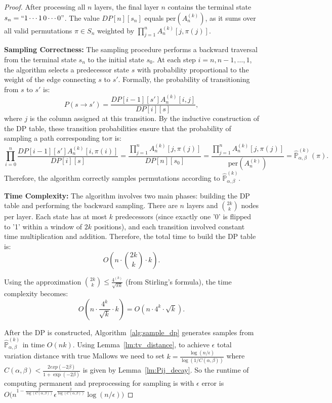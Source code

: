 \documentclass{article}
\renewcommand{\P}{\mathbb{P}}
\begin{document}
\begin{proof}
After processing all \(n\) layers, the final layer \(n\) contains the terminal state \(s_n = ``1\cdots1\,0\cdots0"\). The value \(DP[n][s_n]\) equals \(\text{per}(A_n^{(k)})\), as it sums over all valid permutations \(\pi \in S_n\) weighted by \(\prod_{j=1}^n A_n^{(k)}[j, \pi(j)]\).

\textbf{Sampling Correctness:}
The sampling procedure performs a backward traversal from the terminal state \(s_n\) to the initial state \(s_0\). At each step \(i = n, n-1, \dots, 1\), the algorithm selects a predecessor state \(s\) with probability proportional to the weight of the edge connecting \(s\) to \(s'\). Formally, the probability of transitioning from \(s\) to \(s'\) is:
\[
P(s \rightarrow s') = \frac{ DP[i-1][s'] A_n^{(k)}[i, j]}{DP[i][s]},
\]
where \(j\) is the column assigned at this transition.
By the inductive construction of the DP table, these transition probabilities ensure that the probability of sampling a path
corresponding to\(\pi\) is:
\[\prod_{i=0}^n\frac{ DP[i-1][s'] A_n^{(k)}[i, \pi(i)]}{DP[i][s]}=\frac{\prod_{j=1}^n A_n^{(k)}[j, \pi(j)]}{DP[n][s_0]}=\frac{\prod_{j=1}^n A_n^{(k)}[j, \pi(j)]}{\text{per}(A_n^{(k)})} = \hat{\P}_{\alpha,\beta}^{(k)}(\pi).
\]
Therefore, the algorithm correctly samples permutations according to \(\hat{\P}_{\alpha,\beta}^{(k)}\).

\textbf{Time Complexity:}
The algorithm involves two main phases: building the DP table and performing the backward sampling. There are $n$ layers and  \(\binom{2k}{k}\) nodes per layer. Each state has at most \(k\) predecessors (since exactly one '0' is flipped to '1' within a window of \(2k\) positions), and each transition involved constant time multiplication and addition.     
    Therefore, the total time to build the DP table is:
    \[
    O\left(n \cdot \binom{2k}{k} \cdot k\right).
    \]
    
    Using the approximation \(\binom{2k}{k} \leq \frac{4^{(k)}}{\sqrt{\pi k}}\) (from Stirling's formula), the time complexity becomes:
    \[
    O\left(n \cdot \frac{4^k}{\sqrt{k}} \cdot k\right) = O\left(n \cdot 4^k \cdot \sqrt{k}\right).
    \]
    
After the DP is constructed, Algorithm~\ref{alg:sample_dp} generates samples from \(\hat{\P}_{\alpha,\beta}^{(k)}\) in time \(O(nk)\).
Using Lemma~\ref{lm:tv_distance}, to achieve $\epsilon$ total variation distance with true Mallows we need to set $k=\frac{\log(n/\epsilon)}{\log(1/C(\alpha,\beta))}$ where $C(\alpha,\beta)<\frac{2exp(-2\beta)}{1+\exp(-2\beta)}$ is given by Lemma~\ref{lm:Pij_decay}. So the runtime of computing permanent and preprocessing for sampling is  with $\epsilon$ error is $O\Big(n^{1-\frac{2}{\log(C(\alpha,\beta))}}\epsilon^{\frac{2}{\log(C(\alpha,\beta))}}\log(n/\epsilon)\Big)$
\end{proof}
\end{document}
